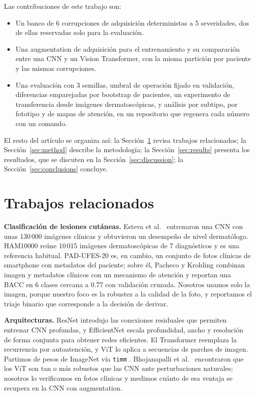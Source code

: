 \documentclass[conference]{IEEEtran}
\begin{document}
Las contribuciones de este trabajo son:
\begin{itemize}
\item Un banco de 6 corrupciones de adquisición deterministas a 5 severidades, dos de ellas reservadas solo para la evaluación.
\item Una augmentation de adquisición para el entrenamiento y su comparación entre una CNN y un Vision Transformer, con la misma partición por paciente y las mismas corrupciones.
\item Una evaluación con 3 semillas, umbral de operación fijado en validación, diferencias emparejadas por bootstrap de pacientes, un experimento de transferencia desde imágenes dermatoscópicas, y análisis por subtipo, por fototipo y de mapas de atención, en un repositorio que regenera cada número con un comando.
\end{itemize}

El resto del artículo se organiza así: la Sección~\ref{sec:related} revisa trabajos relacionados; la Sección~\ref{sec:method} describe la metodología; la Sección~\ref{sec:results} presenta los resultados, que se discuten en la Sección~\ref{sec:discussion}; la Sección~\ref{sec:conclusions} concluye.

\section{Trabajos relacionados}
\label{sec:related}

\textbf{Clasificación de lesiones cutáneas.} Esteva et al.\ \cite{esteva2017} entrenaron una CNN con unas 130\,000 imágenes clínicas y obtuvieron un desempeño de nivel dermatólogo. HAM10000 \cite{tschandl2018} reúne 10\,015 imágenes dermatoscópicas de 7 diagnósticos y es una referencia habitual. PAD-UFES-20 \cite{pacheco2020pad} es, en cambio, un conjunto de fotos clínicas de smartphone con metadatos del paciente; sobre él, Pacheco y Krohling \cite{pacheco2021metablock} combinan imagen y metadatos clínicos con un mecanismo de atención y reportan una BACC en 6 clases cercana a 0.77 con validación cruzada. Nosotros usamos solo la imagen, porque nuestro foco es la robustez a la calidad de la foto, y reportamos el triaje binario que corresponde a la decisión de derivar.

\textbf{Arquitecturas.} ResNet \cite{he2016} introdujo las conexiones residuales que permiten entrenar CNN profundas, y EfficientNet \cite{tan2019} escala profundidad, ancho y resolución de forma conjunta para obtener redes eficientes. El Transformer \cite{vaswani2017} reemplaza la recurrencia por autoatención, y ViT \cite{dosovitskiy2021} lo aplica a secuencias de parches de imagen. Partimos de pesos de ImageNet \cite{deng2009} vía \texttt{timm} \cite{wightman2019}. Bhojanapalli et al.\ \cite{bhojanapalli2021} encontraron que los ViT son tan o más robustos que las CNN ante perturbaciones naturales; nosotros lo verificamos en fotos clínicas y medimos cuánto de esa ventaja se recupera en la CNN con augmentation.
\end{document}
